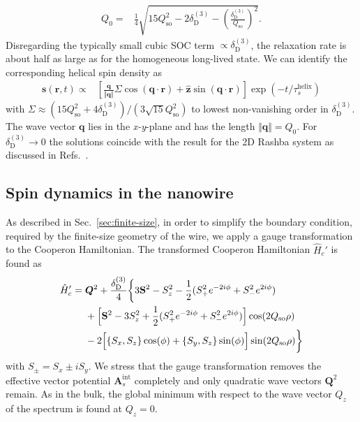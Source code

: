 \documentclass[superscriptaddress,noshowpacs,noshowkeys, twocolumn, floatfix,aps, prb,reprint]{revtex4-1}
\begin{document}
%
\begin{align}
Q_0={}&\frac{1}{4}\sqrt{15 Q_\text{so}^2-2\delta_\text{D}^{(3)}-\left(\frac{\delta_\text{D}^{(3)}}{Q_\text{so}}\right)^2}.
\end{align}
%
Disregarding the typically small cubic SOC term $\propto \delta_\text{D}^{(3)}$, the relaxation rate is about half as large as for the homogeneous long-lived state.  
We can identify the corresponding helical spin density as
%
\begin{align}
\mathbf{s}(\mathbf{r},t)\propto{}&\left[ \frac{\mathbf{q}}{\Vert\mathbf{q}\Vert}\Sigma\cos(\mathbf{q}\cdot\mathbf{r})+ \boldsymbol{\hat{z}} \sin(\mathbf{q}\cdot\mathbf{r})\right]\exp\left(-t/ \tau_s^\text{helix}\right)
\end{align}
%
with $\Sigma\approx (15Q_\text{so}^2+4\delta_\text{D}^{(3)})/(3\sqrt {15}Q_\text{so}^2)$ to lowest non-vanishing order in $\delta_\text{D}^{(3)}$.
The wave vector $\mathbf{q}$ lies in the \textit{x-y}-plane and has the length $\Vert\mathbf{q}\Vert=Q_0$.
For $\delta_\text{D}^{(3)}\rightarrow 0$ the solutions coincide with the result for the 2D Rashba system as discussed in Refs.~.


\subsection{Spin dynamics in the nanowire}\label{sec:relax_nanowire}

As described in Sec.~\ref{sec:finite-size}, in order to simplify the boundary condition, required by the finite-size geometry of the wire, we apply a gauge transformation to the Cooperon Hamiltonian.
The transformed Cooperon Hamiltonian $\hat{H}_c'$ is found as
%
\begin{align}
\hat{H}_c'={}&\boldsymbol{Q}^2+\frac{\delta_\text{D}^{(3)}}{4}\bigg\{3\mathbf{S}^2-S_z^2-\frac{1}{2}(S_+^2 e^{-2i\phi}+S_-^2 e^{2i\phi})\notag\\
&+\Big[ \mathbf{S}^2-3S_z^2+\frac{1}{2}(S_+^2 e^{-2i\phi}+S_-^2 e^{2i\phi})\Big]\cos(2 Q_\text{so}\rho)\notag\\
&-2\Big[ \{S_x,S_z\}\cos(\phi)+ \{S_y,S_z\}\sin(\phi)\Big]\sin(2 Q_\text{so}\rho)\bigg\}
\label{eq:Hc_transf}
\end{align}
%
with $S_\pm=S_x\pm i S_y$.
We stress that the gauge transformation removes the effective vector potential $\mathbf{A}_s^\text{int}$ completely and only quadratic wave vectors $\mathbf{Q}^2$ remain.
As in the bulk, the global minimum with respect to the wave vector $Q_z$ of the spectrum is found at $Q_z=0$.
\end{document}
